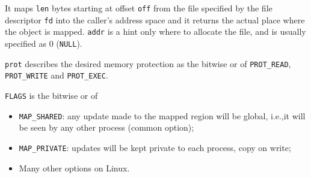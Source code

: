 It maps \texttt{len} bytes starting at offset \texttt{off} from the file specified by the file descriptor \texttt{fd} into the caller's address space and it returns the actual place where the object is mapped. \texttt{addr} is a hint only where to allocate the file, and is usually specified as 0 (\texttt{NULL}).

\texttt{prot} describes the desired memory protection as the bitwise or of \texttt{PROT\_READ}, \texttt{PROT\_WRITE} and \texttt{PROT\_EXEC}.

\texttt{FLAGS} is the bitwise or of
\begin{itemize}
\item \texttt{MAP\_SHARED}: any update made to the mapped region will be global, i.e.,\@ it will be seen by any other process (common option);
\item \texttt{MAP\_PRIVATE}: updates will be kept private to each process, copy on write;
\item Many other options on Linux.
\end{itemize}